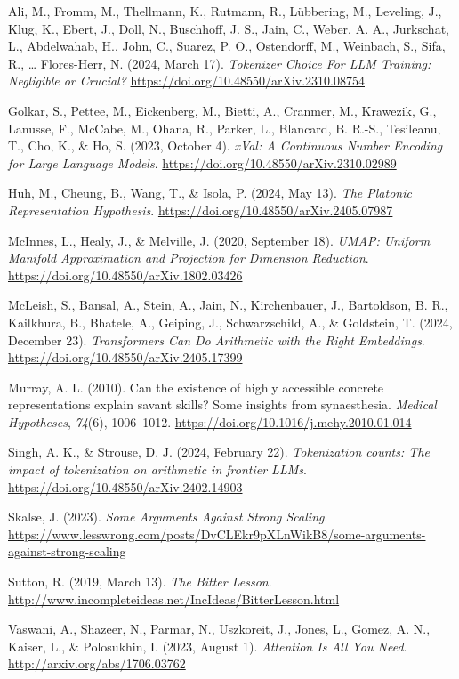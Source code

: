 \documentclass[
  a4paper, twoside, 10pt, titlepage]{book}
\newlength{\cslhangindent}
\newenvironment{CSLReferences}[2] %
 {\begin{list}{}{%
  \setlength{\itemindent}{0pt}
  \setlength{\leftmargin}{0pt}
  \setlength{\parsep}{0pt}
  \ifodd #1
   \setlength{\leftmargin}{\cslhangindent}
   \setlength{\itemindent}{-1\cslhangindent}
  \fi
  \setlength{\itemsep}{#2\baselineskip}}}
 {\end{list}}
\begin{document}
\label{refs}
\begin{CSLReferences}{1}{0}
Ali, M., Fromm, M., Thellmann, K., Rutmann, R., Lübbering, M., Leveling,
J., Klug, K., Ebert, J., Doll, N., Buschhoff, J. S., Jain, C., Weber, A.
A., Jurkschat, L., Abdelwahab, H., John, C., Suarez, P. O., Ostendorff,
M., Weinbach, S., Sifa, R., \ldots{} Flores-Herr, N. (2024, March 17).
\emph{Tokenizer {Choice For LLM Training}: {Negligible} or {Crucial}?}
\url{https://doi.org/10.48550/arXiv.2310.08754}

Golkar, S., Pettee, M., Eickenberg, M., Bietti, A., Cranmer, M.,
Krawezik, G., Lanusse, F., McCabe, M., Ohana, R., Parker, L., Blancard,
B. R.-S., Tesileanu, T., Cho, K., \& Ho, S. (2023, October 4).
\emph{{xVal}: {A Continuous Number Encoding} for {Large Language
Models}}. \url{https://doi.org/10.48550/arXiv.2310.02989}

Huh, M., Cheung, B., Wang, T., \& Isola, P. (2024, May 13). \emph{The
{Platonic Representation Hypothesis}}.
\url{https://doi.org/10.48550/arXiv.2405.07987}

McInnes, L., Healy, J., \& Melville, J. (2020, September 18).
\emph{{UMAP}: {Uniform Manifold Approximation} and {Projection} for
{Dimension Reduction}}. \url{https://doi.org/10.48550/arXiv.1802.03426}

McLeish, S., Bansal, A., Stein, A., Jain, N., Kirchenbauer, J.,
Bartoldson, B. R., Kailkhura, B., Bhatele, A., Geiping, J.,
Schwarzschild, A., \& Goldstein, T. (2024, December 23).
\emph{Transformers {Can Do Arithmetic} with the {Right Embeddings}}.
\url{https://doi.org/10.48550/arXiv.2405.17399}

Murray, A. L. (2010). Can the existence of highly accessible concrete
representations explain savant skills? {Some} insights from
synaesthesia. \emph{Medical Hypotheses}, \emph{74}(6), 1006--1012.
\url{https://doi.org/10.1016/j.mehy.2010.01.014}

Singh, A. K., \& Strouse, D. J. (2024, February 22). \emph{Tokenization
counts: The impact of tokenization on arithmetic in frontier {LLMs}}.
\url{https://doi.org/10.48550/arXiv.2402.14903}

Skalse, J. (2023). \emph{Some {Arguments Against Strong Scaling}}.
\url{https://www.lesswrong.com/posts/DvCLEkr9pXLnWikB8/some-arguments-against-strong-scaling}

Sutton, R. (2019, March 13). \emph{The {Bitter Lesson}}.
\url{http://www.incompleteideas.net/IncIdeas/BitterLesson.html}

Vaswani, A., Shazeer, N., Parmar, N., Uszkoreit, J., Jones, L., Gomez,
A. N., Kaiser, L., \& Polosukhin, I. (2023, August 1). \emph{Attention
{Is All You Need}}. \url{http://arxiv.org/abs/1706.03762}

\end{CSLReferences}

\backmatter
\end{document}
